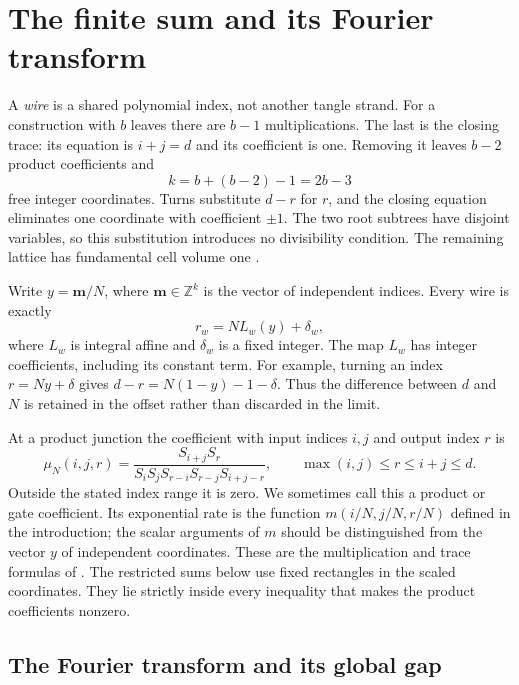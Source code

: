 \section{The finite sum and its Fourier transform}\label{ca:packet}

A \emph{wire} is a shared polynomial index, not another tangle strand.
For a construction with $b$ leaves there are $b-1$ multiplications.
The last is the closing trace: its equation is $i+j=d$ and its
coefficient is one. Removing it leaves $b-2$ product coefficients
and
\[
 k=b+(b-2)-1=2b-3
\]
free integer coordinates. Turns substitute $d-r$ for $r$, and the
closing equation eliminates one coordinate with coefficient $\pm1$.
The two root subtrees have disjoint variables, so this substitution
introduces no divisibility condition. The remaining lattice has
fundamental cell volume one \cite[Lemma 6.1]{Newton}.

Write $y=\mathbf m/N$, where $\mathbf m\in\mathbb Z^k$ is the
vector of independent indices. Every wire is exactly
\begin{equation}\label{ca:offsets}
 r_w=NL_w(y)+\delta_w,
\end{equation}
where $L_w$ is integral affine and $\delta_w$ is a fixed integer.
The map $L_w$ has integer coefficients, including its constant term.
For example, turning an index $r=Ny+\delta$ gives
$d-r=N(1-y)-1-\delta$. Thus the difference between $d$ and $N$
is retained in the offset rather than discarded in the limit.

At a product junction the coefficient with input indices $i,j$ and
output index $r$ is
\begin{equation}\label{ca:gate}
 \mu_N(i,j,r)=
 \frac{S_{i+j}S_r}{S_iS_jS_{r-i}S_{r-j}S_{i+j-r}},
 \qquad \max(i,j)\le r\le i+j\le d.
\end{equation}
Outside the stated index range it is zero. We sometimes call this a
product or gate coefficient. Its exponential rate is the function
$m(i/N,j/N,r/N)$ defined in the introduction; the scalar arguments
of $m$ should be distinguished from the vector $y$ of independent
coordinates. These are the multiplication and trace formulas of
\cite[Proposition 3.2 and Theorem 3.3]{Newton}.
The restricted sums below use fixed rectangles in the scaled
coordinates. They lie strictly inside every inequality that makes the
product coefficients nonzero.



\subsection{The Fourier transform and its global gap}


